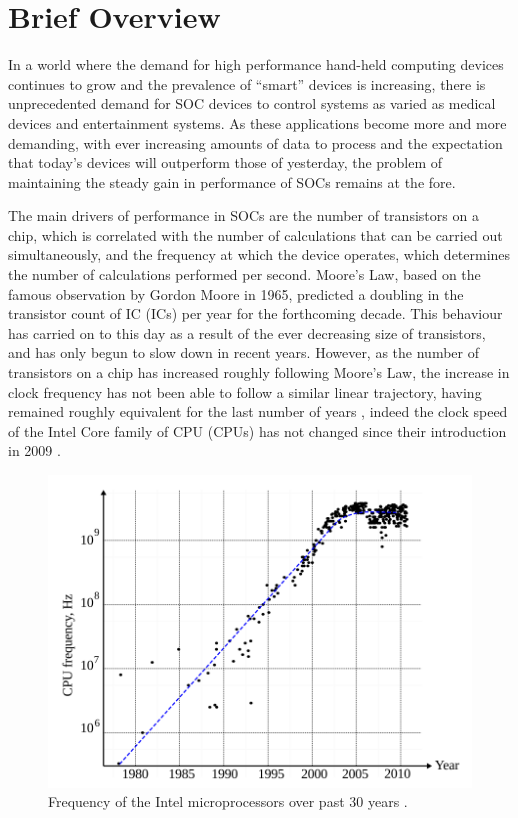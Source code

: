 \section{Brief Overview}
In a world where the demand for high performance hand-held computing devices continues to grow and the prevalence of ``smart'' devices is increasing, there is unprecedented demand for \ac{SOC} devices to control systems as varied as medical devices and entertainment systems.
As these applications become more and more demanding, with ever increasing amounts of data to process and the expectation that today's devices will outperform those of yesterday, the problem of maintaining the steady gain in performance of \acp{SOC} remains at the fore.

The main drivers of performance in \acp{SOC} are the number of transistors on a chip, which is correlated with the number of calculations that can be carried out simultaneously, and the frequency at which the device operates, which determines the number of calculations performed per second.
Moore's Law, based on the famous observation by Gordon Moore in 1965\cite{moore1965cramming}, predicted a doubling in the transistor count of \acl{IC} (\acs{IC}s) per year for the forthcoming decade. This behaviour has carried on to this day as a result of the ever decreasing size of transistors, and has only begun to slow down in recent years.
However, as the number of transistors on a chip has increased roughly following Moore's Law, the increase in clock frequency has not been able to follow a similar linear trajectory, having remained roughly equivalent for the last number of years \cite{ross2008cpu}, indeed the clock speed of the Intel Core family of \acl{CPU} (\acs{CPU}s) has not changed since their introduction in 2009 \cite{intelark}.
\begin{figure}[h]
	\centering
	\includegraphics[scale=0.4]{../eldar_last_30_yrs}
	\caption[Frequency of the Intel microprocessors over past 30 years]{Frequency of the Intel microprocessors over past 30 years \cite{zianbetov2013phd}.}
	\label{fig:eldar_last_30_yrs}
\end{figure}\\
